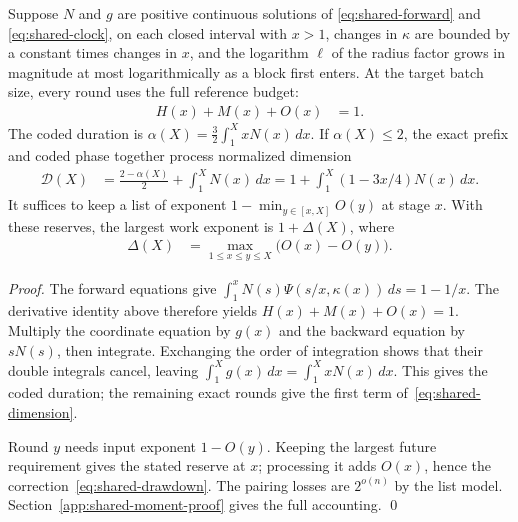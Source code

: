 \documentclass[runningheads,envcountsame,envcountsect,orivec]{llncs}
\begin{document}
\begin{lemma}
\label{lem:shared-moment}
Suppose $N$ and $g$ are positive continuous solutions of
\eqref{eq:shared-forward} and \eqref{eq:shared-clock},
on each closed interval with $x>1$, changes in $\kappa$ are
bounded by a constant times changes in $x$, and the logarithm
$\ell$ of the radius factor grows in magnitude at most
logarithmically as a block first enters. At the target batch size, every round uses
the full reference budget:
\begin{align}
 H(x)+M(x)+O(x)&=1.
 \label{eq:shared-saturation}
\end{align}
The coded duration is $\alpha(X)=\tfrac32\int_1^X xN(x)\,dx$.
If $\alpha(X)\le2$, the exact prefix and coded phase together
process normalized dimension
\begin{align}
 \mathcal D(X)
 &=\frac{2-\alpha(X)}2+\int_1^X N(x)\,dx
  =1+\int_1^X(1-3x/4)N(x)\,dx .
 \label{eq:shared-dimension}
\end{align}
It suffices to keep a list of exponent
$1-\min_{y\in[x,X]}O(y)$ at stage $x$.
With these reserves, the largest work exponent is
$1+\Delta(X)$, where
\begin{align}
 \Delta(X)&=\max_{1\le x\le y\le X}\bigl(O(x)-O(y)\bigr).
 \label{eq:shared-drawdown}
\end{align}
\end{lemma}

\begin{proof}
The forward equations give
$\int_1^xN(s)\Psi(s/x,\kappa(x))\,ds=1-1/x$.
The derivative identity above therefore yields
$H(x)+M(x)+O(x)=1$.
Multiply the coordinate equation by $g(x)$ and the backward
equation by $sN(s)$, then integrate. Exchanging the order of
integration shows that their double integrals cancel, leaving
$\int_1^Xg(x)\,dx=\int_1^XxN(x)\,dx$.
This gives the coded duration; the remaining exact rounds
give the first term of~\eqref{eq:shared-dimension}.

Round $y$ needs input exponent $1-O(y)$. Keeping the largest
future requirement gives the stated reserve at $x$; processing
it adds $O(x)$, hence the correction~\eqref{eq:shared-drawdown}.
The pairing losses are $2^{o(n)}$ by the list model.
Section~\ref{app:shared-moment-proof} gives the full accounting.
\qed
\end{proof}
\end{document}
